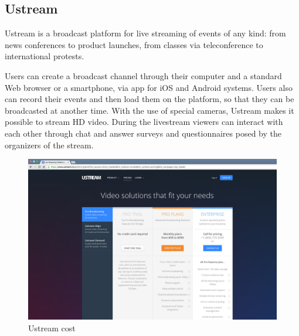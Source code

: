 \subsection{Ustream}
\label{sec:Ustream}
 Ustream is a broadcast platform for live streaming of events of any kind: from news conferences to product launches, from classes via teleconference to international protests.

Users can create a broadcast channel through their computer and a standard Web browser or a smartphone, via app for iOS and Android systems.
Users also can record their events and then load them on the platform, so that they can be broadcasted at another time. With the use of special cameras, Ustream makes it possible to stream HD video.
During the livestream viewers can interact with each other through chat and answer surveys and questionnaires posed by the organizers of the stream.

  
 \begin{figure}[!htb]
 \centering
 \includegraphics[width=1.0\linewidth]{images/chapter2/ustream.png}\hfill
 \caption[Ustream cost]{Ustream cost}
 \label{fig:fourV}
\end{figure}